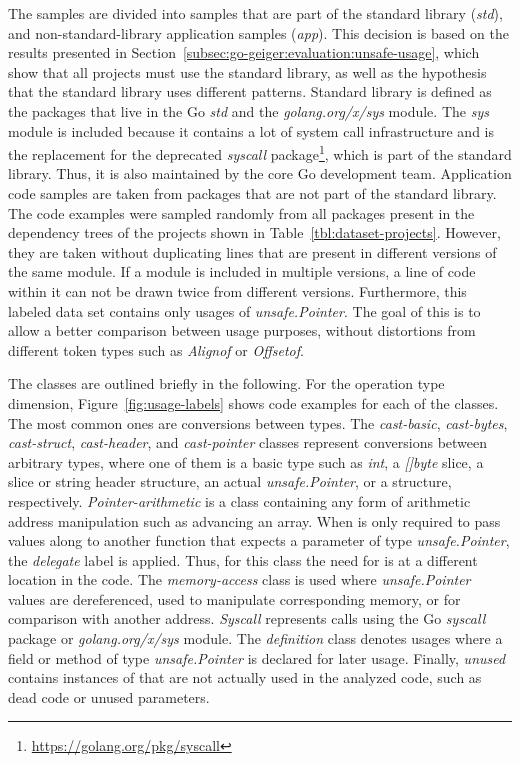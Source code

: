 

The samples are divided into \numberLabeledCodeSnippetsStd{} samples that are part of the standard library
(\textit{std}), and \numberLabeledCodeSnippetsApp{} non-standard-library application samples (\textit{app}).
This decision is based on the results presented in Section~\ref{subsec:go-geiger:evaluation:unsafe-usage}, which show
that all projects must use the standard library, as well as the hypothesis that the standard library uses different
\unsafe{} patterns.
Standard library is defined as the packages that live in the Go \textit{std} and the \textit{golang.org/x/sys} module.
The \textit{sys} module is included because it contains a lot of system call infrastructure and is the replacement for
the deprecated \textit{syscall} package\footnote{\url{https://golang.org/pkg/syscall}}, which is part of the standard
library.
Thus, it is also maintained by the core Go development team.
Application code samples are taken from packages that are not part of the standard library.
The \numberLabeledCodeSnippets{} code examples were sampled randomly from all packages present in the dependency trees
of the projects shown in Table~\ref{tbl:dataset-projects}.
However, they are taken without duplicating lines that are present in different versions of the same module.
If a module is included in multiple versions, a line of code within it can not be drawn twice from different versions.
Furthermore, this labeled data set contains only usages of \textit{unsafe.Pointer}.
The goal of this is to allow a better comparison between usage purposes, without distortions from different \unsafe{}
token types such as \textit{Alignof} or \textit{Offsetof}.

The classes are outlined briefly in the following.
For the \unsafe{} operation type dimension, Figure~\ref{fig:usage-labels} shows code examples for each of the classes.
The most common ones are conversions between types.
The \textit{cast-basic}, \textit{cast-bytes}, \textit{cast-struct}, \textit{cast-header}, and \textit{cast-pointer}
classes represent conversions between arbitrary types, where one of them is a basic type such as \textit{int}, a
\textit{[]byte} slice, a slice or string header structure, an actual \textit{unsafe.Pointer}, or a structure,
respectively.
\textit{Pointer-arithmetic} is a class containing any form of arithmetic address manipulation such as advancing an
array.
When \unsafe{} is only required to pass values along to another function that expects a parameter of type
\textit{unsafe.Pointer}, the \textit{delegate} label is applied.
Thus, for this class the need for \unsafe{} is at a different location in the code.
The \textit{memory-access} class is used where \textit{unsafe.Pointer} values are dereferenced, used to manipulate
corresponding memory, or for comparison with another address.
\textit{Syscall} represents calls using the Go \textit{syscall} package or \textit{golang.org/x/sys} module.
The \textit{definition} class denotes usages where a field or method of type \textit{unsafe.Pointer} is declared for
later usage.
Finally, \textit{unused} contains instances of \unsafe{} that are not actually used in the analyzed code, such as dead
code or unused parameters.


